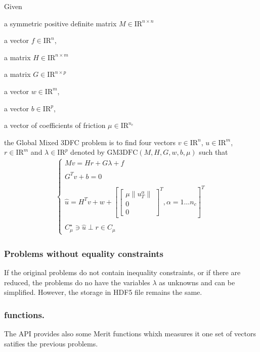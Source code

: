 Given 
\begin{DoxyItemize}
\item a symmetric positive definite matrix ${M} \in {\mathrm{I\!R}}^{n \times n}$ 
\item a vector $ {f} \in {\mathrm{I\!R}}^n$, 
\item a matrix ${H} \in {\mathrm{I\!R}}^{n \times m}$ 
\item a matrix ${G} \in {\mathrm{I\!R}}^{n \times p}$ 
\item a vector $w \in {\mathrm{I\!R}}^{m}$, 
\item a vector $b \in {\mathrm{I\!R}}^{p}$, 
\item a vector of coefficients of friction $\mu \in {\mathrm{I\!R}}^{n_c}$ 
\end{DoxyItemize}the Global Mixed 3\-D\-F\-C problem is to find four vectors $ {v} \in {\mathrm{I\!R}}^n$, $u\in{\mathrm{I\!R}}^m$, $r\in {\mathrm{I\!R}}^m$ and $\lambda \in {\mathrm{I\!R}}^p$ denoted by $\mathrm{GM3DFC}(M,H,G,w,b,\mu)$ such that \begin{eqnarray*} \begin{cases} M v = {H} {r} + G\lambda + {f} \\ \\ G^T v +b =0 \\ \\ \hat u = H^T v + w +\left[ \left[\begin{array}{c} \mu \|u^\alpha_T\|\\ 0 \\ 0 \end{array}\right]^T, \alpha = 1 \ldots n_c \right]^T \\ \\ C^\star_{\mu} \ni {\hat u} \perp r \in C_{\mu} \end{cases} \end{eqnarray*} \hypertarget{index_wihtout}{}\subsubsection{Problems without equality constraints}\label{index_wihtout}
If the original problems do not contain inequality constraints, or if there are reduced, the problems do no have the variables $\lambda$ as unknowns and can be simplified. However, the storage in H\-D\-F5 file remains the same.\hypertarget{index_Merict}{}\subsubsection{functions.}\label{index_Merict}
The A\-P\-I provides also some Merit functions whixh measures it one set of vectors satifies the previous problems. 